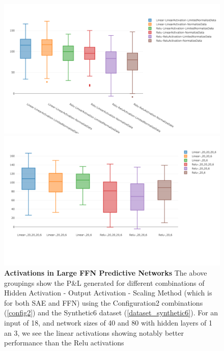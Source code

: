 \documentclass[a4paper,latin]{paper}
\begin{document}

\begin{figure}[H]
	\centering
	\begin{minipage}{0.45\textwidth}
	\centering \includegraphics[scale=0.2]{images/iteration_two/linear-ffn/Scaling_Methodolgy_Profits.png}
	\caption{\textbf{Activations in Large FFN Predictive Networks}
		\newline The above groupings show the P\&L generated for different combinations of Hidden Activation - Output Activation - Scaling Method (which is for both SAE and FFN) using the Configuration2 combinations (\ref{config2}) and the Synthetic6 dataset (\ref{dataset_synthetic6}). For an input of 18, and network sizes of 40 and 80 with hidden layers of 1 an 3, we see the linear activations showing notably better performance than the Relu activations
	}	
	\label{figure-results-linear-ffn_activations}
	\end{minipage}\hfill
	\begin{minipage}{0.45\textwidth}
	\centering \includegraphics[scale=0.2]{images/iteration_three/it3_linear_vs_relu.png}

\end{minipage}
\end{figure}
\end{document}
